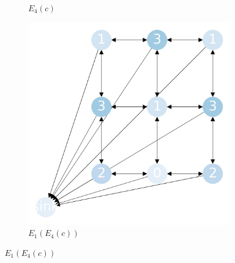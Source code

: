\documentclass{beamer}
\begin{document}
\begin{frame}
\begin{figure}[h!]
\begin{subfigure}[b]{0.3\linewidth}
      \caption{$E_4(c)$}
    \end{subfigure}
    \begin{subfigure}[b]{0.3\linewidth}
      \includegraphics[width=\linewidth]{sandpile_chip_fire_2}
      \caption{$E_1(E_4(c))$}
    \end{subfigure}
  \end{figure}


\end{frame}
\end{document}
